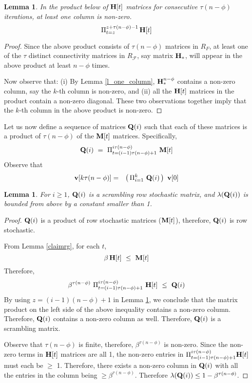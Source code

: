\documentclass[letterpaper, 11pt]{article}
\newtheorem{lemma}[theorem]{Lemma}
\newcommand{\calF}{{\mathcal{F}}}
\begin{document}
\begin{lemma}
\label{l_product_H}
In the product below of ${\bf H}[t]$ matrices for consecutive
$\tau(n-\phi)$ iterations, at least one column is non-zero.
\[
\Pi_{t=z}^{z+\tau(n-\phi)-1} \, {\bf H}[t]
\]
\end{lemma}
\begin{proof}
Since the above product consists of $\tau(n-\phi)$ matrices
in $R_F$,
at least one of the $\tau$ distinct connectivity matrices
in $R_\calF$, say matrix ${\bf H}_*$, will appear in the above
product at least $n-\phi$ times.

Now observe that: (i)
By Lemma \ref{l_one_column}, ${\bf H}_*^{n-\phi}$ contains a non-zero
column, say the $k$-th column is non-zero,
and (ii) all the ${\bf H}[t]$ matrices in the product contain a non-zero diagonal.
These two observations together imply that the $k$-th column in the above product
is non-zero.
\end{proof}


Let us now define a sequence of matrices ${\bf Q}(i)$ such that
each of these matrices is a product of $\tau(n-\phi)$ of the
${\bf M}[t]$ matrices. Specifically,
\[
{\bf Q}(i) ~=~ \Pi_{t=(i-1)\tau(n-\phi)+1}^{i\tau(n-\phi)} ~ {\bf M}[t]
\]
Observe that
\begin{eqnarray}
{\bf v}[k\tau(n-\phi)] & = & \left(\, \Pi_{i=1}^k ~ {\bf Q}(i) \,\right)~{\bf v}[0]
\end{eqnarray}


\begin{lemma}
\label{l_Q}
For $i\geq 1$, ${\bf Q}(i)$ is a scrambling row stochastic matrix,
and $\lambda({\bf Q}(i))$ is bounded from above by a constant
smaller than 1.
\end{lemma}
\begin{proof}


${\bf Q}(i)$ is a product of row stochastic matrices (${\bf M}[t]$), therefore,
${\bf Q}(i)$ is row stochastic.

From Lemma \ref{claimrg}, for each $t$,
\[
\beta \, {\bf H}[t] ~ \leq ~ {\bf M}[t]
\]
Therefore,
\[
\beta^{\tau(n-\phi)} ~ \Pi_{t=(i-1)\tau(n-\phi)+1}^{i\tau(n-\phi)} ~ {\bf H}[t] ~ \leq
~ {\bf Q}(i)
\]
By using $z=(i-1)(n-\phi)+1$ in Lemma \ref{l_product_H},
we conclude that the matrix product on the left side
of the above inequality contains a non-zero column. Therefore, ${\bf Q}(i)$ contains
a non-zero column as well. Therefore, ${\bf Q}(i)$ is a scrambling matrix.

Observe that $\tau(n-\phi)$ is finite, therefore, $\beta^{\tau(n-\phi)}$
is non-zero. Since the non-zero terms in ${\bf H}[t]$ matrices are all 1,
the non-zero entries in $\Pi_{t=(i-1)\tau(n-\phi)+1}^{i\tau(n-\phi)} {\bf H}[t]$
must each be $\geq$ 1. Therefore, there exists a non-zero column in ${\bf Q}(i)$
with all the entries in the column being $\geq \beta^{\tau(n-\phi)}$.
Therefore $\lambda({\bf Q}(i))\leq 1-\beta^{\tau(n-\phi)}$.
\end{proof}
\end{document}
